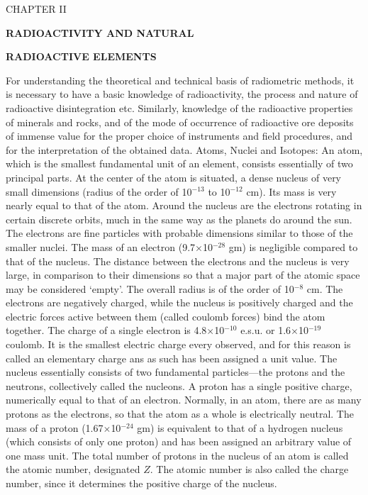 \topglue 0pt
\vskip 2cm
\centerline{CHAPTER II}
\vskip 2cm
\centerline{\bf RADIOACTIVITY AND NATURAL}
\centerline{\bf RADIOACTIVE ELEMENTS}
\vskip 2cm
{\sc For understanding the} theoretical and technical basis of radiometric methods, it is necessary to have a basic knowledge of radioactivity, the process and nature of radioactive disintegration etc.
Similarly, knowledge of the radioactive properties of minerals and rocks, and of the mode of occurrence of radioactive ore deposits of immense value for the proper choice of instruments and field procedures, and for the interpretation of the obtained data.
\bigskip
\noindent
{ Atoms, Nuclei and Isotopes:}
\smallskip
An atom, which is the smallest fundamental unit of an element, consists essentially of two principal parts.
At the center of the atom is situated, a dense nucleus of very small dimensions (radius of the order of 10$^{-13}$ to 10$^{-12}$ cm).
Its mass is very nearly equal to that of the atom.
Around the nucleus are the electrons rotating in certain discrete orbits, much in the same way as the planets do around the sun.
The electrons are fine particles with probable dimensions similar to those of the smaller nuclei.
The mass of an electron (9.7$\times$10$^{-28}$ gm) is negligible compared to that of the nucleus.
The distance between the electrons and the nucleus is very large, in comparison to their dimensions so that a major part of the atomic space may be considered `empty'.
The overall radius is of the order of 10$^{-8}$ cm.
\smallskip
The electrons are negatively charged, while the nucleus is positively charged and the electric forces active between them (called coulomb forces) bind the atom together.
The charge of a single electron is 4.8$\times$10$^{-10}$ e.s.u. or 1.6$\times$10$^{-19}$ coulomb.
It is the smallest electric charge every observed, and for this reason is called an elementary charge ans as such has been assigned a unit value.
\smallskip
The nucleus essentially consists of two fundamental particles---the protons and the neutrons, collectively called the nucleons.
A proton has a single positive charge, numerically equal to that of an electron.
Normally, in an atom, there are as many protons as the electrons, so that the atom as a whole is electrically neutral.
The mass of a proton (1.67$\times$10$^{-24}$ gm) is equivalent to that of a hydrogen nucleus (which consists of only one proton) and has been assigned an arbitrary value of one mass unit.
\smallskip
The total number of protons in the nucleus of an atom is called the atomic number, designated $Z$.
The atomic number is also called the charge number, since it determines the positive charge of the nucleus.
